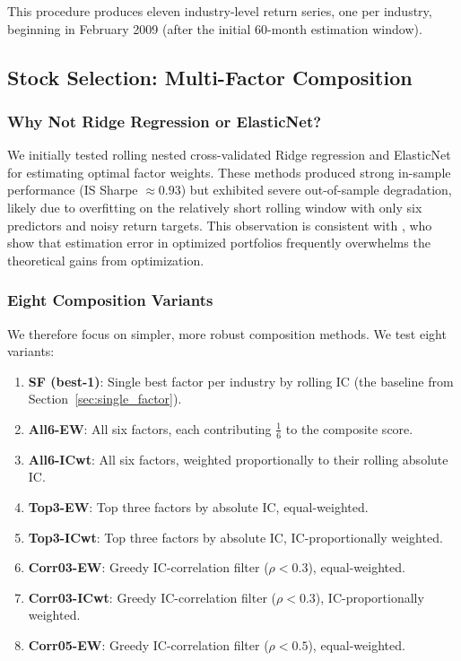 \documentclass[12pt,a4paper]{article}
\begin{document}
This procedure produces eleven industry-level return series, one per industry, beginning in February 2009 (after the initial 60-month estimation window).

\subsection{Stock Selection: Multi-Factor Composition}
\label{sec:multifactor}

\subsubsection{Why Not Ridge Regression or ElasticNet?}

We initially tested rolling nested cross-validated Ridge regression and ElasticNet for estimating optimal factor weights. These methods produced strong in-sample performance (IS Sharpe $\approx 0.93$) but exhibited severe out-of-sample degradation, likely due to overfitting on the relatively short rolling window with only six predictors and noisy return targets. This observation is consistent with \citet{demiguel2009}, who show that estimation error in optimized portfolios frequently overwhelms the theoretical gains from optimization.

\subsubsection{Eight Composition Variants}

We therefore focus on simpler, more robust composition methods. We test eight variants:

\begin{enumerate}
    \item \textbf{SF (best-1)}: Single best factor per industry by rolling IC (the baseline from Section~\ref{sec:single_factor}).
    \item \textbf{All6-EW}: All six factors, each contributing $\frac{1}{6}$ to the composite score.
    \item \textbf{All6-ICwt}: All six factors, weighted proportionally to their rolling absolute IC.
    \item \textbf{Top3-EW}: Top three factors by absolute IC, equal-weighted.
    \item \textbf{Top3-ICwt}: Top three factors by absolute IC, IC-proportionally weighted.
    \item \textbf{Corr03-EW}: Greedy IC-correlation filter ($\rho < 0.3$), equal-weighted.
    \item \textbf{Corr03-ICwt}: Greedy IC-correlation filter ($\rho < 0.3$), IC-proportionally weighted.
    \item \textbf{Corr05-EW}: Greedy IC-correlation filter ($\rho < 0.5$), equal-weighted.
\end{enumerate}
\end{document}
